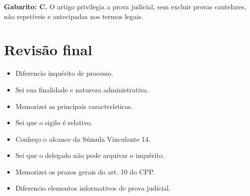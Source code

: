 \documentclass[11pt,a4paper]{article}
\begin{document}
\begin{alerta}
\textbf{Gabarito: C.} O artigo privilegia a prova judicial, sem excluir provas cautelares, não repetíveis e antecipadas nos termos legais.
\end{alerta}

\section*{Revisão final}

\begin{itemize}
  \item[$\square$] Diferencio inquérito de processo.
  \item[$\square$] Sei sua finalidade e natureza administrativa.
  \item[$\square$] Memorizei as principais características.
  \item[$\square$] Sei que o sigilo é relativo.
  \item[$\square$] Conheço o alcance da Súmula Vinculante 14.
  \item[$\square$] Sei que o delegado não pode arquivar o inquérito.
  \item[$\square$] Memorizei os prazos gerais do art. 10 do CPP.
  \item[$\square$] Diferencio elementos informativos de prova judicial.
\end{itemize}
\end{document}
